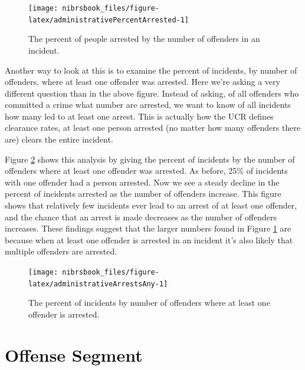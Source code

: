 \documentclass[
  12pt,
  openany]{book}
\begin{document}
\begin{figure}

{\centering \texttt{[image: nibrsbook\_files/figure-latex/administrativePercentArrested-1]} 

}

\caption{The percent of people arrested by the number of offenders in an incident.}\label{fig:administrativePercentArrested}
\end{figure}

Another way to look at this is to examine the percent of incidents, by number of offenders, where at least one offender was arrested. Here we're asking a very different question than in the above figure. Instead of asking, of all offenders who committed a crime what number are arrested, we want to know of all incidents how many led to at least one arrest. This is actually how the UCR defines clearance rates, at least one person arrested (no matter how many offenders there are) clears the entire incident.

Figure \ref{fig:administrativeArrestsAny} shows this analysis by giving the percent of incidents by the number of offenders where at least one offender was arrested. As before, 25\% of incidents with one offender had a person arrested. Now we see a steady decline in the percent of incidents arrested as the number of offenders increase. This figure shows that relatively few incidents ever lead to an arrest of at least one offender, and the chance that an arrest is made decreases as the number of offenders increases. These findings suggest that the larger numbers found in Figure \ref{fig:administrativePercentArrested} are because when at least one offender is arrested in an incident it's also likely that multiple offenders are arrested.

\begin{figure}

{\centering \texttt{[image: nibrsbook\_files/figure-latex/administrativeArrestsAny-1]} 

}

\caption{The percent of incidents by number of offenders where at least one offender is arrested.}\label{fig:administrativeArrestsAny}
\end{figure}

\hypertarget{offenseSegment}{%
\chapter{Offense Segment}\label{offenseSegment}}
\end{document}
